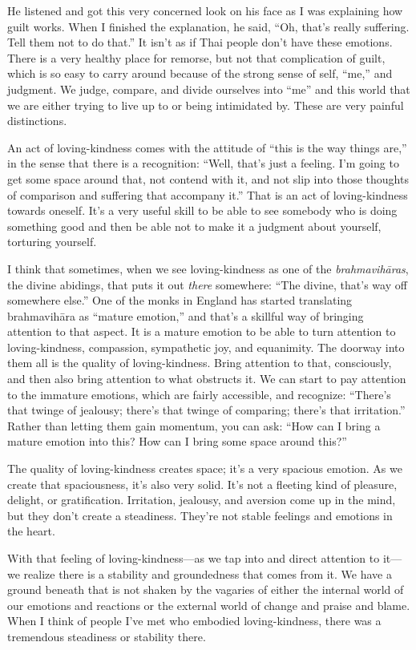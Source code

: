 He listened and got this very concerned look on his face as I was
explaining how guilt works. When I finished the explanation, he said,
“Oh, that’s really suffering. Tell them not to do that.” It isn’t as if
Thai people don’t have these emotions. There is a very healthy place for
remorse, but not that complication of guilt, which is so easy to carry
around because of the strong sense of self, “me,” and judgment. We
judge, compare, and divide ourselves into “me” and this world that we
are either trying to live up to or being intimidated by. These are very
painful distinctions.

An act of loving-kindness comes with the attitude of “this is the way
things are,” in the sense that there is a recognition: “Well, that’s
just a feeling. I’m going to get some space around that, not contend
with it, and not slip into those thoughts of comparison and suffering
that accompany it.” That is an act of loving-kindness towards oneself.
It’s a very useful skill to be able to see somebody who is doing
something good and then be able not to make it a judgment about
yourself, torturing yourself.

I think that sometimes, when we see loving-kindness as one of the
\emph{brahmavihāras}, the divine abidings, that puts it out \emph{there}
somewhere: “The divine, that’s way off somewhere else.” One of the monks
in England has started translating brahmavihāra as “mature emotion,” and
that’s a skillful way of bringing attention to that aspect. It is a
mature emotion to be able to turn attention to loving-kindness,
compassion, sympathetic joy, and equanimity. The doorway into them all
is the quality of loving-kindness. Bring attention to that, consciously,
and then also bring attention to what obstructs it. We can start to pay
attention to the immature emotions, which are fairly accessible, and
recognize: “There’s that twinge of jealousy; there’s that twinge of
comparing; there’s that irritation.” Rather than letting them gain
momentum, you can ask: “How can I bring a mature emotion into this? How
can I bring some space around this?”

The quality of loving-kindness creates space; it’s a very spacious
emotion. As we create that spaciousness, it’s also very solid. It’s not
a fleeting kind of pleasure, delight, or gratification. Irritation,
jealousy, and aversion come up in the mind, but they don’t create a
steadiness. They’re not stable feelings and emotions in the heart.

With that feeling of loving-kindness—as we tap into and direct attention
to it—we realize there is a stability and groundedness that comes from
it. We have a ground beneath that is not shaken by the vagaries of
either the internal world of our emotions and reactions or the external
world of change and praise and blame. When I think of people I’ve met
who embodied loving-kindness, there was a tremendous steadiness or
stability there.

